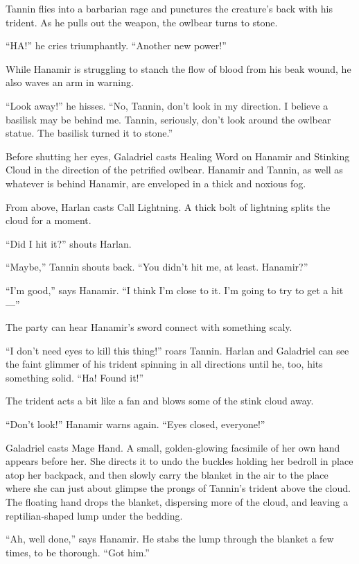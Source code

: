 \documentclass[smalldemyvopaper,11pt,twoside,onecolumn,openright,extrafontsizes]{memoir}
\newlength\drop
\begin{document}
Tannin flies into a barbarian rage and punctures the creature's back
with his trident. As he pulls out the weapon, the owlbear turns to
stone.

``HA!'' he cries triumphantly. ``Another new power!''

While Hanamir is struggling to stanch the flow of blood from his beak
wound, he also waves an arm in warning.

``Look away!'' he hisses. ``No, Tannin, don't look in my direction. I
believe a basilisk may be behind me. Tannin, seriously, don't look
around the owlbear statue. The basilisk turned it to stone.''

Before shutting her eyes, Galadriel casts Healing Word on Hanamir and
Stinking Cloud in the direction of the petrified owlbear. Hanamir and
Tannin, as well as whatever is behind Hanamir, are enveloped in a thick
and noxious fog.

From above, Harlan casts Call Lightning. A thick bolt of lightning
splits the cloud for a moment.

``Did I hit it?'' shouts Harlan.

``Maybe,'' Tannin shouts back. ``You didn't hit me, at least. Hanamir?''

``I'm good,'' says Hanamir. ``I think I'm close to it. I'm going to try
to get a hit---''

The party can hear Hanamir's sword connect with something scaly.

``I don't need eyes to kill this thing!'' roars Tannin. Harlan and
Galadriel can see the faint glimmer of his trident spinning in all
directions until he, too, hits something solid. ``Ha! Found it!''

The trident acts a bit like a fan and blows some of the stink cloud
away.

``Don't look!'' Hanamir warns again. ``Eyes closed, everyone!''

Galadriel casts Mage Hand. A small, golden-glowing facsimile of her own
hand appears before her. She directs it to undo the buckles holding her
bedroll in place atop her backpack, and then slowly carry the blanket in
the air to the place where she can just about glimpse the prongs of
Tannin's trident above the cloud. The floating hand drops the blanket,
dispersing more of the cloud, and leaving a reptilian-shaped lump under
the bedding.

``Ah, well done,'' says Hanamir. He stabs the lump through the blanket a
few times, to be thorough. ``Got him.''
\end{document}
